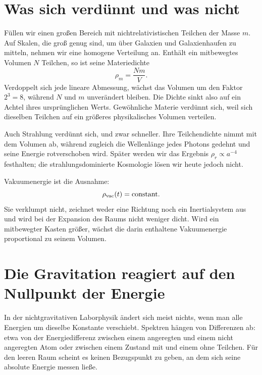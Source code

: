 \section{Was sich verdünnt und was nicht}

Füllen wir einen großen Bereich mit nichtrelativistischen Teilchen der Masse \(m\). Auf Skalen, die groß genug sind, um über Galaxien und Galaxienhaufen zu mitteln, nehmen wir eine homogene Verteilung an. Enthält ein mitbewegtes Volumen \(N\) Teilchen, so ist seine Materiedichte
\begin{equation}
\rho_m=\frac{Nm}{V}.
\end{equation}
Verdoppelt sich jede lineare Abmessung, wächst das Volumen um den Faktor \(2^3=8\), während \(N\) und \(m\) unverändert bleiben. Die Dichte sinkt also auf ein Achtel ihres ursprünglichen Werts. Gewöhnliche Materie verdünnt sich, weil sich dieselben Teilchen auf ein größeres physikalisches Volumen verteilen.

Auch Strahlung verdünnt sich, und zwar schneller. Ihre Teilchendichte nimmt mit dem Volumen ab, während zugleich die Wellenlänge jedes Photons gedehnt und seine Energie rotverschoben wird. Später werden wir das Ergebnis \(\rho_r\propto a^{-4}\) festhalten; die strahlungsdominierte Kosmologie lösen wir heute jedoch nicht.

Vakuumenergie ist die Ausnahme:
\begin{equation}
\rho_{\rm vac}(t)=\text{constant}.
\label{eq:l08-rho-vac-constant}
\end{equation}
Sie verklumpt nicht, zeichnet weder eine Richtung noch ein Inertialsystem aus und wird bei der Expansion des Raums nicht weniger dicht. Wird ein mitbewegter Kasten größer, wächst die darin enthaltene Vakuumenergie proportional zu seinem Volumen.


\section{Die Gravitation reagiert auf den Nullpunkt der Energie}

In der nichtgravitativen Laborphysik ändert sich meist nichts, wenn man alle Energien um dieselbe Konstante verschiebt. Spektren hängen von Differenzen ab: etwa von der Energiedifferenz zwischen einem angeregten und einem nicht angeregten Atom oder zwischen einem Zustand mit und einem ohne Teilchen. Für den leeren Raum scheint es keinen Bezugspunkt zu geben, an dem sich seine absolute Energie messen ließe.

